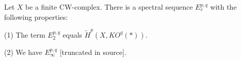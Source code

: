 Let $X$ be a finite CW-complex. There is a spectral sequence $E_{r}^{p,q}$ with the following properties:

(1) The term $E_{2}^{p,q}$ equals $\tilde{H}^p(X, KO^q(*))$.

(2) We have $E_{\infty}^{p,q}$ [truncated in source].
